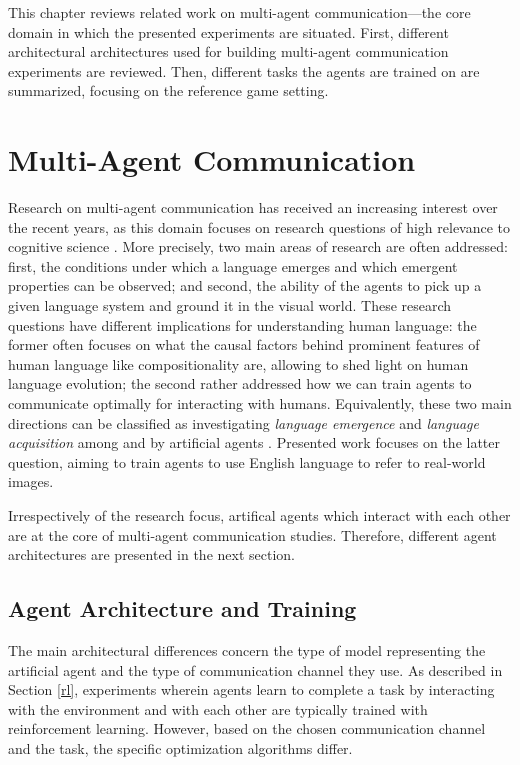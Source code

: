 
This chapter reviews related work on multi-agent communication---the core domain in which the presented experiments are situated. First, different architectural architectures used for building multi-agent communication experiments are reviewed. Then, different tasks the agents are trained on are summarized, focusing on the reference game setting. 

\section{Multi-Agent Communication}
Research on multi-agent communication has received an increasing interest over the recent years, as this domain focuses on research questions of high relevance to cognitive science \parencite{lazaridou2020emergent}. More precisely, two main areas of research are often addressed: first, the conditions under which a language emerges and which emergent properties can be observed; and second, the ability of the agents to pick up a given language system and ground it in the visual world.%
These research questions have different implications for understanding human language: the former often focuses on what the causal factors behind prominent features of human language like compositionality are, allowing to shed light on human language evolution; the second rather addressed how we can train agents to communicate optimally for interacting with humans. Equivalently, these two main directions can be classified as investigating \textit{language emergence} and \textit{language acquisition} among and by artificial agents \parencite{lazaridou2018emergence, lazaridou2020emergent}.
Presented work focuses on the latter question, aiming to train agents to use English language to refer to real-world images.

Irrespectively of the research focus, artifical agents which interact with each other are at the core of multi-agent communication studies. Therefore, different agent architectures are presented in the next section.

\subsection{Agent Architecture and Training}

The main architectural differences concern the type of model representing the artificial agent and the type of communication channel they use.
As described in Section \ref{rl}, experiments wherein agents learn to complete a task by interacting with the environment and with each other are typically trained with reinforcement learning. However, based on the chosen communication channel and the task, the specific optimization algorithms differ. 

